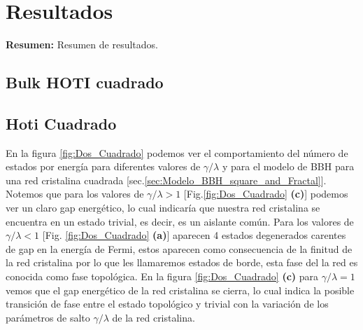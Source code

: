 \chapter{Resultados}

\begin{center}
\begin{minipage}{0.9\textwidth}
{\small
{\bf Resumen:} Resumen de resultados.
}
\end{minipage}
\end{center}

\section{Bulk HOTI cuadrado}



\section{Hoti Cuadrado}

En la figura \ref{fig:Dos_Cuadrado} podemos ver el comportamiento del número de estados por energía para diferentes valores de $\gamma/\lambda$ y para el modelo de BBH para una red cristalina cuadrada [sec.\ref{sec:Modelo_BBH_square_and_Fractal}]. Notemos que para los valores de $\gamma/\lambda>1$ [Fig.\ref{fig:Dos_Cuadrado} \textbf{(c)}] podemos ver un claro gap energético, lo cual indicaría que nuestra red cristalina se encuentra en un estado trivial, es decir, es un aislante común. Para los valores de $\gamma/\lambda<1$ [Fig. \ref{fig:Dos_Cuadrado} \textbf{(a)}] aparecen 4 estados degenerados carentes de gap en la energía de Fermi, estos aparecen como consecuencia de la finitud de la red cristalina por lo que les llamaremos estados de borde, esta fase del la red es conocida como fase topológica. En la figura \ref{fig:Dos_Cuadrado} \textbf{(c)} para $\gamma/\lambda = 1$ vemos que el gap energético de la red cristalina se cierra, lo cual indica la posible transición de fase entre el estado topológico y trivial con la variación de los parámetros de salto $\gamma/\lambda$ de la red cristalina.


